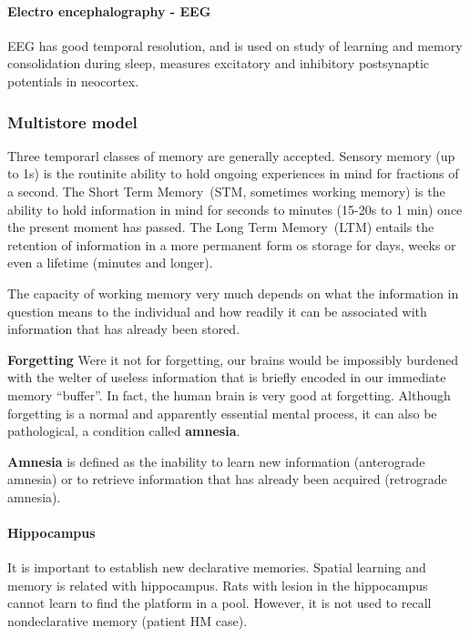 \documentclass[12pt,article,oneside,a4paper]{memoir}
\begin{document}
\paragraph{Electro encephalography - EEG}
EEG has good temporal resolution, and is used on study of learning and memory
consolidation during sleep, measures excitatory and inhibitory postsynaptic
potentials in neocortex.

\subsubsection{Multistore model}
Three temporarl classes of memory are generally accepted.
Sensory memory (up to 1s) is the routinite ability to hold ongoing experiences
in mind for fractions of a second. The Short Term Memory~(STM, sometimes working
memory) is the ability to hold information in mind for seconds to minutes
(15-20s to 1 min) once the present moment has passed. The Long Term Memory~(LTM)
entails the retention of information in a more permanent form os storage for days,
weeks or even a lifetime (minutes and longer).

The capacity of working memory very much depends on what the information in
question means to the individual and how readily it can be associated with
information that has already been stored.

\textbf{Forgetting} Were it not for forgetting, our brains would be impossibly
burdened with the welter of useless information that is briefly encoded in our
immediate memory ``buffer''. In fact, the human brain is very good at forgetting.
Although forgetting is a normal and apparently essential mental process, it can
also be pathological, a condition called \textbf{amnesia}.

\textbf{Amnesia} is defined as the inability to learn new information (anterograde
amnesia) or to retrieve information that has already been acquired (retrograde
amnesia).

\paragraph{Hippocampus}
It is important to establish new declarative memories.
Spatial learning and memory is related with hippocampus. Rats with lesion in the
hippocampus cannot learn to find the platform in a pool. However, it is not used
to recall nondeclarative memory (patient HM case).
\end{document}
